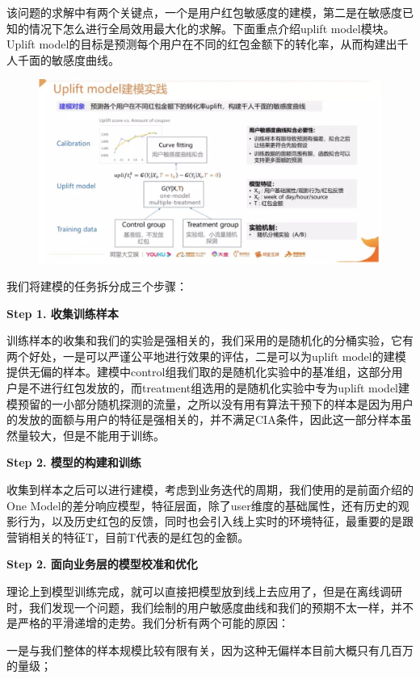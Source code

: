 \documentclass[12pt]{article}
\begin{document}
该问题的求解中有两个关键点，一个是用户红包敏感度的建模，第二是在敏感度已知的情况下怎么进行全局效用最大化的求解。下面重点介绍uplift model模块。Uplift model的目标是预测每个用户在不同的红包金额下的转化率，从而构建出千人千面的敏感度曲线。
\begin{figure}[H]
    \centering
    \includegraphics[width=1\textwidth]{fig/CasualInference-Uplift-Model-In-Ali3.png}
\end{figure}

我们将建模的任务拆分成三个步骤：

\textbf{ Step 1. 收集训练样本}

训练样本的收集和我们的实验是强相关的，我们采用的是随机化的分桶实验，它有两个好处，一是可以严谨公平地进行效果的评估，二是可以为uplift model的建模提供无偏的样本。建模中control组我们取的是随机化实验中的基准组，这部分用户是不进行红包发放的，而treatment组选用的是随机化实验中专为uplift model建模预留的一小部分随机探测的流量，之所以没有用有算法干预下的样本是因为用户的发放的面额与用户的特征是强相关的，并不满足CIA条件，因此这一部分样本虽然量较大，但是不能用于训练。

\textbf{ Step 2. 模型的构建和训练}

收集到样本之后可以进行建模，考虑到业务迭代的周期，我们使用的是前面介绍的One Model的差分响应模型，特征层面，除了user维度的基础属性，还有历史的观影行为，以及历史红包的反馈，同时也会引入线上实时的环境特征，最重要的是跟营销相关的特征T，目前T代表的是红包的金额。

\textbf{ Step 2. 面向业务层的模型校准和优化}

理论上到模型训练完成，就可以直接把模型放到线上去应用了，但是在离线调研时，我们发现一个问题，我们绘制的用户敏感度曲线和我们的预期不太一样，并不是严格的平滑递增的走势。我们分析有两个可能的原因：

一是与我们整体的样本规模比较有限有关，因为这种无偏样本目前大概只有几百万的量级；
\end{document}
